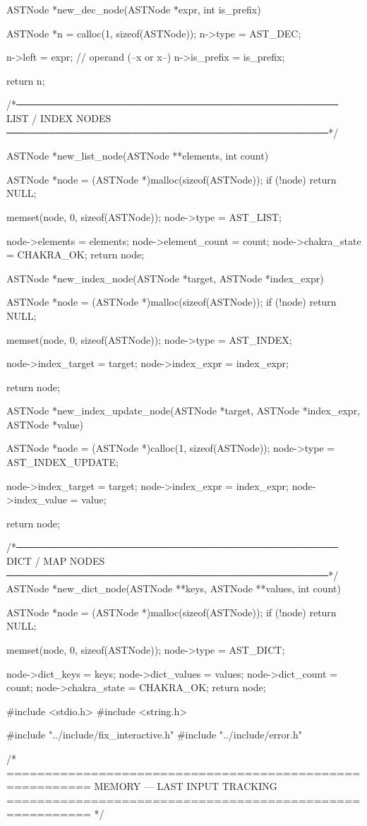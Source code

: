 \documentclass{article}
\begin{document}
ASTNode *new_dec_node(ASTNode *expr, int is_prefix)
{
    ASTNode *n = calloc(1, sizeof(ASTNode));
    n->type = AST_DEC;

    n->left = expr;          // operand (--x or x--)
    n->is_prefix = is_prefix;

    return n;
}

/*──────────────────────────────────────────────
  LIST / INDEX NODES
──────────────────────────────────────────────*/

ASTNode *new_list_node(ASTNode **elements, int count)
{
    ASTNode *node = (ASTNode *)malloc(sizeof(ASTNode));
    if (!node) return NULL;

    memset(node, 0, sizeof(ASTNode));
    node->type = AST_LIST;

    node->elements = elements;
    node->element_count = count;
    node->chakra_state = CHAKRA_OK;
    return node;
}

ASTNode *new_index_node(ASTNode *target, ASTNode *index_expr)
{
    ASTNode *node = (ASTNode *)malloc(sizeof(ASTNode));
    if (!node) return NULL;

    memset(node, 0, sizeof(ASTNode));
    node->type = AST_INDEX;

    node->index_target = target;
    node->index_expr   = index_expr;

    return node;
}

ASTNode *new_index_update_node(ASTNode *target, ASTNode *index_expr, ASTNode *value)
{
    ASTNode *node = (ASTNode *)calloc(1, sizeof(ASTNode));
    node->type = AST_INDEX_UPDATE;

    node->index_target = target;
    node->index_expr = index_expr;
    node->index_value = value;

    return node;
}
/*──────────────────────────────────────────────
  DICT / MAP NODES
──────────────────────────────────────────────*/
ASTNode *new_dict_node(ASTNode **keys, ASTNode **values, int count)
{
    ASTNode *node = (ASTNode *)malloc(sizeof(ASTNode));
    if (!node) return NULL;

    memset(node, 0, sizeof(ASTNode));
    node->type = AST_DICT;

    node->dict_keys = keys;
    node->dict_values = values;
    node->dict_count = count;
    node->chakra_state = CHAKRA_OK;
    return node;
}
#include <stdio.h>
#include <string.h>

#include "../include/fix_interactive.h"
#include "../include/error.h"

/* =========================================================
   MEMORY — LAST INPUT TRACKING
========================================================= */
\end{document}
